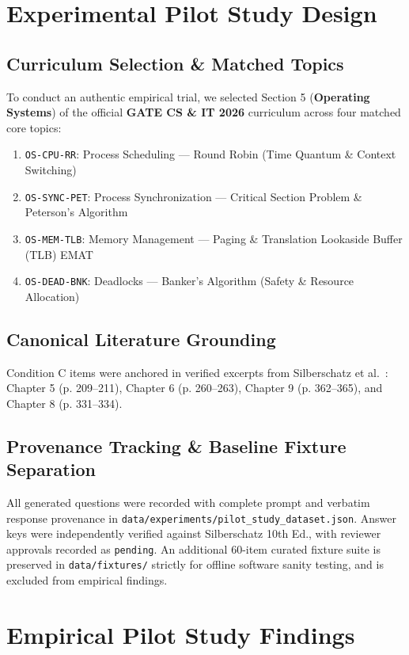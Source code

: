 \documentclass[10pt,twocolumn,letterpaper]{article}
\begin{document}
\section{Experimental Pilot Study Design}

\subsection{Curriculum Selection \& Matched Topics}
To conduct an authentic empirical trial, we selected Section 5 (\textbf{Operating Systems}) of the official \textbf{GATE CS \& IT 2026} curriculum across four matched core topics:
\begin{enumerate}
    \item \texttt{OS-CPU-RR}: Process Scheduling --- Round Robin (Time Quantum \& Context Switching)
    \item \texttt{OS-SYNC-PET}: Process Synchronization --- Critical Section Problem \& Peterson's Algorithm
    \item \texttt{OS-MEM-TLB}: Memory Management --- Paging \& Translation Lookaside Buffer (TLB) EMAT
    \item \texttt{OS-DEAD-BNK}: Deadlocks --- Banker's Algorithm (Safety \& Resource Allocation)
\end{enumerate}

\subsection{Canonical Literature Grounding}
Condition C items were anchored in verified excerpts from Silberschatz et al.~\cite{silberschatz2018operating}: Chapter 5 (p. 209--211), Chapter 6 (p. 260--263), Chapter 9 (p. 362--365), and Chapter 8 (p. 331--334).

\subsection{Provenance Tracking \& Baseline Fixture Separation}
All generated questions were recorded with complete prompt and verbatim response provenance in \texttt{data/experiments/pilot\_study\_dataset.json}. Answer keys were independently verified against Silberschatz 10th Ed., with reviewer approvals recorded as \texttt{pending}. An additional 60-item curated fixture suite is preserved in \texttt{data/fixtures/} strictly for offline software sanity testing, and is excluded from empirical findings.

\section{Empirical Pilot Study Findings}
\end{document}
